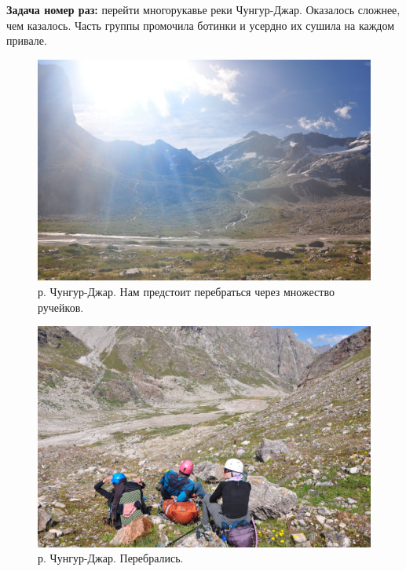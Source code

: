 \textbf{Задача номер раз:} перейти многорукавье реки Чунгур-Джар. Оказалось сложнее, чем казалось. Часть группы промочила ботинки и усердно их сушила на каждом привале.

\begin{figure}[h!]
	\centering
	\includegraphics[width=0.7\linewidth]{../pics/DSC_0254.jpg}
	\caption{р. Чунгур-Джар. Нам предстоит перебраться через множество ручейков.}
	\label{fig:DSC_0254}
\end{figure}
\begin{figure}[h!]
	\centering
	\includegraphics[width=0.7\linewidth]{../pics/DSC_0277.jpg}
	\caption{р. Чунгур-Джар. Перебрались.}
	\label{fig:DSC_0277}
\end{figure}


